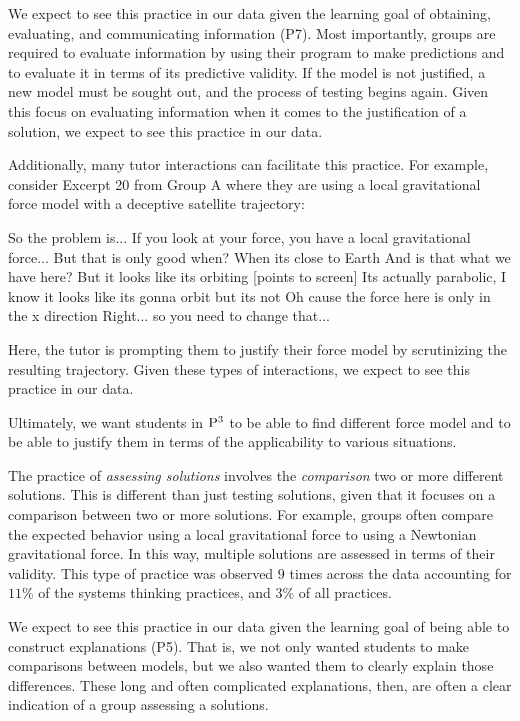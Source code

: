 \documentclass{msuphddissertation}
\begin{document}
\begin{doublespace}
We expect to see this practice in our data given the learning goal of obtaining, evaluating, and communicating information (P7).  Most importantly, groups are required to evaluate information by using their program to make predictions and to evaluate it in terms of its predictive validity.  If the model is not justified, a new model must be sought out, and the process of testing begins again.  Given this focus on evaluating information when it comes to the justification of a solution, we expect to see this practice in our data.

Additionally, many tutor interactions can facilitate this practice.  For example, consider Excerpt 20 from Group A where they are using a local gravitational force model with a deceptive satellite trajectory: \begin{description}
\TA So the problem is...
\TA If you look at your force, you have a local gravitational force...
\TA But that is only good when?
\SB When its close to Earth
\TA And is that what we have here?
\SA But it looks like its orbiting [points to screen]
\TA Its actually parabolic, I know it looks like its gonna orbit but its not
\SB Oh cause the force here is only in the x direction
\TA Right... so you need to change that...
\end{description}  Here, the tutor is prompting them to justify their force model by scrutinizing the resulting trajectory.  Given these types of interactions, we expect to see this practice in our data.

Ultimately, we want students in ${\rm P}^{3}$ to be able to find different force model and to be able to justify them in terms of the applicability to various situations.

The practice of \textit{assessing solutions} involves the \textit{comparison} two or more different solutions.  This is different than just testing solutions, given that it focuses on a comparison between two or more solutions.  For example, groups often compare the expected behavior using a local gravitational force to using a Newtonian gravitational force.  In this way, multiple solutions are assessed in terms of their validity.   This type of practice was observed $9$ times across the data  accounting for $11\%$ of the systems thinking practices, and $3\%$ of all practices.

We expect to see this practice in our data given the learning goal of being able to construct explanations (P5).  That is, we not only wanted students to make comparisons between models, but we also wanted them to clearly explain those differences.  These long and often complicated explanations, then, are often a clear indication of a group assessing a solutions.  


\end{doublespace}
\end{document}
